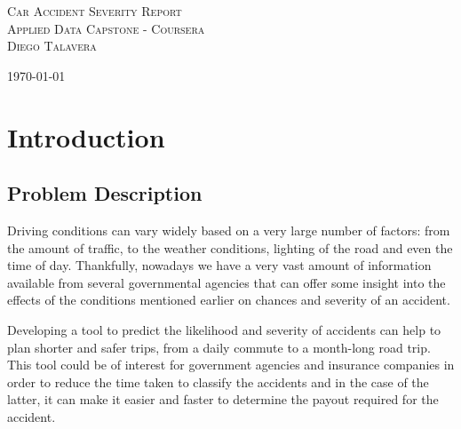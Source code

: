 \documentclass{article}
\begin{document}
	
	\begin{titlepage}
		\center
		\newcommand{\HRule}{\rule{\linewidth}{0.5mm}}
			\textsc{\Huge Car Accident Severity Report}\\[1.5cm]
			\textsc{\LARGE Applied Data Capstone - Coursera}\\[0.3cm]
			\textsc{\large Diego Talavera}\\[0.5cm]
		
			\vfill\vfill\vfill %
			
			{\large\today} %
	\end{titlepage}
	
	
	\newpage				%
	\renewcommand{\contentsname}{Table of Contents}
	\tableofcontents		%
	
	
	\newpage
	\section{Introduction}
	\subsection{Problem Description}
		Driving conditions can vary widely based on a very large number of factors: from the amount of traffic, to the weather conditions, lighting of the road and even the time of day. Thankfully, nowadays we have a very vast amount of information available from several governmental agencies that can offer some insight into the effects of the conditions mentioned earlier on chances and severity of an accident.
		
		Developing a tool to predict the likelihood and severity of accidents can help to plan shorter and safer trips, from a daily commute to a month-long road trip. This tool could be of interest for government agencies and insurance companies in order to reduce the time taken to classify the accidents and in the case of the latter, it can make it easier and faster to determine the payout required for the accident.
	
\end{document}
